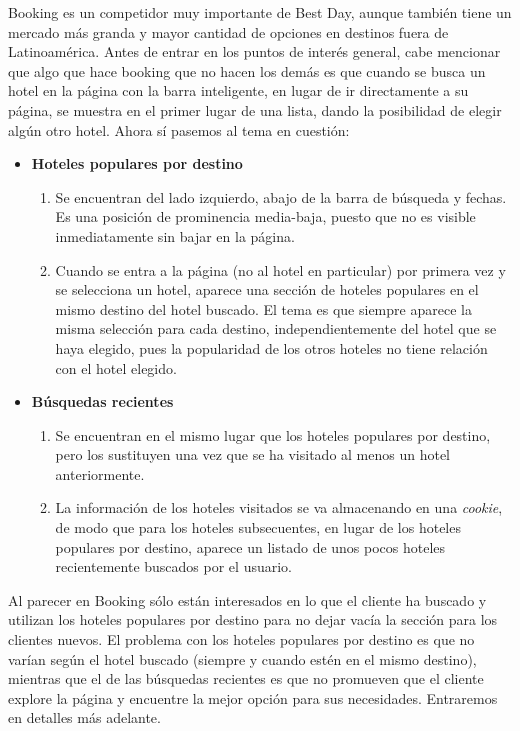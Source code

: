 \documentclass[12pt]{report}
\begin{document}
Booking es un competidor muy importante de Best Day, aunque también tiene un mercado más granda y mayor cantidad de opciones en destinos fuera de Latinoamérica. Antes de entrar en los puntos de interés general, cabe mencionar que algo que hace booking que no hacen los demás es que cuando se busca un hotel en la página con la barra inteligente, en lugar de ir directamente a su página, se muestra en el primer lugar de una lista, dando la posibilidad de elegir algún otro hotel. Ahora sí pasemos al tema en cuestión:
\begin{itemize}
	\item \textbf{Hoteles populares por destino}
	\begin{enumerate}
		\item Se encuentran del lado izquierdo, abajo de la barra de búsqueda y fechas. Es una posición de prominencia media-baja, puesto que no es visible inmediatamente sin bajar en la página.
		\item Cuando se entra a la página (no al hotel en particular) por primera vez y se selecciona un hotel, aparece una sección de hoteles populares en el mismo destino del hotel buscado. El tema es que siempre aparece la misma selección para cada destino, independientemente del hotel que se haya elegido, pues la popularidad de los otros hoteles no tiene relación con el hotel elegido.
	\end{enumerate}
	\item \textbf{Búsquedas recientes}
	\begin{enumerate}
		\item Se encuentran en el mismo lugar que los hoteles populares por destino, pero los sustituyen una vez que se ha visitado al menos un hotel anteriormente.
		\item La información de los hoteles visitados se va almacenando en una \emph{cookie}, de modo que para los hoteles subsecuentes, en lugar de los hoteles populares por destino, aparece un listado de unos pocos hoteles recientemente buscados por el usuario.
	\end{enumerate}
\end{itemize}
Al parecer en Booking sólo están interesados en lo que el cliente ha buscado y utilizan los hoteles populares por destino para no dejar vacía la sección para los clientes nuevos. El problema con los hoteles populares por destino es que no varían según el hotel buscado (siempre y cuando estén en el mismo destino), mientras que el de las búsquedas recientes es que no promueven que el cliente explore la página y encuentre la mejor opción para sus necesidades. Entraremos en detalles más adelante.
\end{document}
